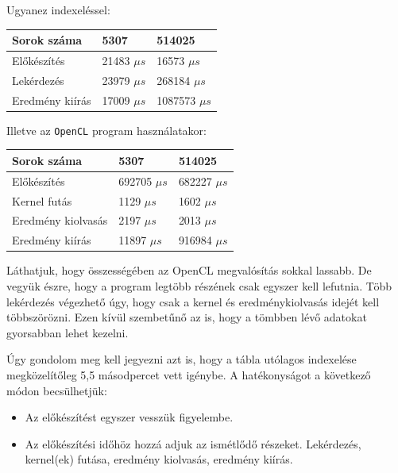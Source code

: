 \noindent Ugyanez indexeléssel:

\begin{table}[h!]
\centering
\begin{tabular}{|p{6cm}|p{3cm}|p{3cm}|}
\hline
Sorok száma & 5307 & 514025 \\
\hline
\hline

Előkészítés & 21483 $\mu s$ & 16573 $\mu s$ \\
\hline

Lekérdezés & 23979 $\mu s$ & 268184 $\mu s$ \\
\hline

Eredmény kiírás & 17009 $\mu s$ & 1087573 $\mu s$ \\
\hline
\end{tabular}
\end{table}

\newpage

\noindent Illetve az \texttt{OpenCL} program használatakor:

\begin{table}[h!]
\centering
\begin{tabular}{|p{6cm}|p{3cm}|p{3cm}|}
\hline
Sorok száma & 5307 & 514025 \\
\hline
\hline
Előkészítés & 692705 $\mu s$ & 682227 $\mu s$ \\
\hline
Kernel futás & 1129 $\mu s$ & 1602 $\mu s$ \\
\hline
Eredmény kiolvasás & 2197 $\mu s$ & 2013 $\mu s$ \\
\hline
Eredmény kiírás & 11897 $\mu s$ & 916984 $\mu s$ \\
\hline
\end{tabular}
\end{table}

Láthatjuk, hogy összességében az OpenCL megvalósítás sokkal lassabb. De vegyük észre, hogy a program legtöbb részének csak egyszer kell lefutnia. 
Több lekérdezés végezhető úgy, hogy csak a  kernel és eredménykiolvasás idejét kell többszörözni. Ezen kívül szembetűnő az is, hogy a tömbben lévő adatokat gyorsabban lehet kezelni.

Úgy gondolom meg kell jegyezni azt is, hogy a tábla utólagos indexelése megközelítőleg 5,5 másodpercet vett igénybe.
\newline A hatékonyságot a következő módon becsülhetjük:
\begin{itemize}
\item Az előkészítést egyszer vesszük figyelembe.
\item Az előkészítési időhöz hozzá adjuk az ismétlődő részeket.
Lekérdezés, kernel(ek) futása, eredmény kiolvasás, eredmény kiírás.
\end{itemize}

